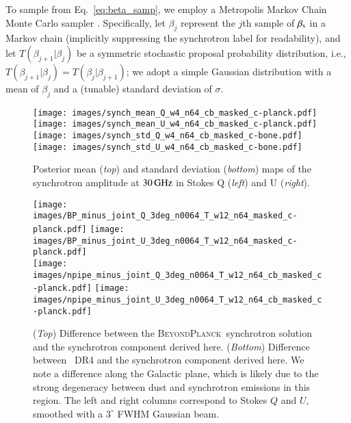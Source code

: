 \documentclass[twocolumn]{aa}
\newcommand{\BP}{\textsc{BeyondPlanck}}
\begin{document}
To sample from Eq.~\eqref{eq:beta_samp}, we employ a Metropolis Markov
Chain Monte Carlo sampler \citep{metropolis:1953,bp01}. Specifically,
let $\beta_{j}$ represent the $j$th sample of $\beta_{\rm s}$ in a
Markov chain (implicitly suppressing the synchrotron label for
readability), and let $T(\beta_{j+1} |
\beta_{j})$ be a symmetric stochastic proposal probability
distribution, i.e., $T(\beta_{j+1} | \beta_{j})
= T(\beta_{j} | \beta_{j+1})$; we adopt a simple
Gaussian distribution with a mean of $\beta_{j}$ and a
(tunable) standard deviation of $\sigma$.

\begin{figure*}[p]
\centering
\texttt{[image: images/synch\_mean\_Q\_w4\_n64\_cb\_masked\_c-planck.pdf]}
\texttt{[image: images/synch\_mean\_U\_w4\_n64\_cb\_masked\_c-planck.pdf]}\\
\texttt{[image: images/synch\_std\_Q\_w4\_n64\_cb\_masked\_c-bone.pdf]}
\texttt{[image: images/synch\_std\_U\_w4\_n64\_cb\_masked\_c-bone.pdf]}
\caption{Posterior mean (\textit{top}) and standard deviation (\textit{bottom}) maps of the synchrotron amplitude at ${\rm 30\,GHz}$ in Stokes Q (\textit{left}) and U (\textit{right}).}
\label{fig:synch}
\vspace*{5mm}
\texttt{[image: images/BP\_minus\_joint\_Q\_3deg\_n0064\_T\_w12\_n64\_masked\_c-planck.pdf]}
\texttt{[image: images/BP\_minus\_joint\_U\_3deg\_n0064\_T\_w12\_n64\_masked\_c-planck.pdf]}\\
\texttt{[image: images/npipe\_minus\_joint\_Q\_3deg\_n0064\_T\_w12\_n64\_cb\_masked\_c-planck.pdf]}
\texttt{[image: images/npipe\_minus\_joint\_U\_3deg\_n0064\_T\_w12\_n64\_cb\_masked\_c-planck.pdf]}
\caption{(\textit{Top}) Difference between the \BP\ synchrotron solution \citep{bp14} and the synchrotron component derived here. (\textit{Bottom}) Difference between \Planck\ DR4 and the synchrotron component derived here. We note a difference along the Galactic plane, which is likely due to the strong degeneracy between dust and synchrotron emissions in this region. The left and right columns correspond to Stokes $Q$ and $U$, smoothed with a $3^\circ$ FWHM Gaussian beam.}
\label{fig:BP_npipe_diff}
\end{figure*}
\end{document}

